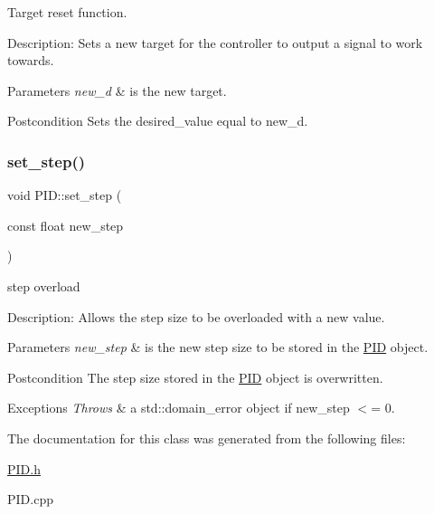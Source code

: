 Target reset function. 

Description\+: Sets a new target for the controller to output a signal to work towards. 
\begin{DoxyParams}{Parameters}
{\em new\+\_\+d} & is the new target. \\
\hline
\end{DoxyParams}
\begin{DoxyPostcond}{Postcondition}
Sets the desired\+\_\+value equal to new\+\_\+d. 
\end{DoxyPostcond}
\mbox{\label{classPID_ac22392c392dd8a95806fce3708eb3090}} 
\subsubsection{\texorpdfstring{set\+\_\+step()}{set\_step()}}
{\footnotesize\ttfamily void P\+I\+D\+::set\+\_\+step (\begin{DoxyParamCaption}\item[{const float}]{new\+\_\+step }\end{DoxyParamCaption})}



step overload 

Description\+: Allows the step size to be overloaded with a new value. 
\begin{DoxyParams}{Parameters}
{\em new\+\_\+step} & is the new step size to be stored in the \hyperlink{classPID}{P\+ID} object. \\
\hline
\end{DoxyParams}
\begin{DoxyPostcond}{Postcondition}
The step size stored in the \hyperlink{classPID}{P\+ID} object is overwritten. 
\end{DoxyPostcond}

\begin{DoxyExceptions}{Exceptions}
{\em Throws} & a std\+::domain\+\_\+error object if new\+\_\+step $<$= 0. \\
\hline
\end{DoxyExceptions}


The documentation for this class was generated from the following files\+:\begin{DoxyCompactItemize}
\item 
\hyperlink{PID_8h}{P\+I\+D.\+h}\item 
P\+I\+D.\+cpp\end{DoxyCompactItemize}

